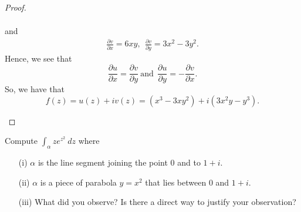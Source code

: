 \documentclass[a4paper]{article}
\begin{document}
\begin{proof}
\begin{enumerate}
\begin{align*}
        \end{align*}
        and
        \begin{align*}
            \frac{\partial v }{\partial x }  = 6xy, \ \     \frac{\partial v }{\partial y }  = 3 x^{2} - 3 y^{2}.
        \end{align*}
        Hence, we see that 
        \[  \frac{\partial u }{\partial x }  = \frac{\partial v }{\partial y }  \ \text{and} \ \ \frac{\partial u }{\partial y }  = - \frac{\partial v }{\partial x }. \]
        So, we have that 
        \[  f(z) = u(z) + i v(z) = (x^{3} - 3x y^{2})  + i (3 x^{2} y - y^{3}). \]
\end{enumerate}
\end{proof}



\begin{problem}
   Compute \( \displaystyle \int_{\alpha}^{}  z e^{z^{2}} \ dz \) where 
   \begin{enumerate}
       \item[(i)] \( \alpha  \) is the line segment joining the point \( 0  \) and to \( 1 + i \).
        \item[(ii)] \( \alpha \) is a piece of parabola \( y = x^{2} \) that lies between \( 0  \) and \( 1 + i \).
        \item[(iii)] What did you observe? Is there a direct way to justify your observation?
   \end{enumerate}
\end{problem}
\end{document}
